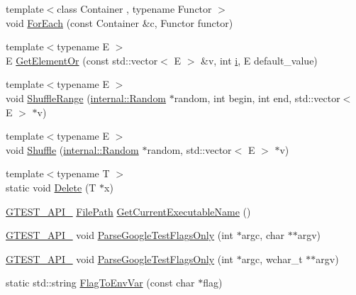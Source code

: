 \begin{DoxyCompactItemize}
\item 
{\footnotesize template$<$class Container , typename Functor $>$ }\\void \hyperlink{namespacetesting_1_1internal_a52f5504ed65d116201ccb8f99a44fd7e}{For\+Each} (const Container \&c, Functor functor)
\item 
{\footnotesize template$<$typename E $>$ }\\E \hyperlink{namespacetesting_1_1internal_a71fdd20a0686bea3dc0cdcd95e0bca1c}{Get\+Element\+Or} (const std\+::vector$<$ E $>$ \&v, int \hyperlink{gtest__output__test__golden__lin_8txt_a7e98b8a17c0aad30ba64d47b74e2a6c1}{i}, E default\+\_\+value)
\item 
{\footnotesize template$<$typename E $>$ }\\void \hyperlink{namespacetesting_1_1internal_a0e1d3dc36138a591769412d4c7779861}{Shuffle\+Range} (\hyperlink{classtesting_1_1internal_1_1Random}{internal\+::\+Random} $\ast$random, int begin, int end, std\+::vector$<$ E $>$ $\ast$v)
\item 
{\footnotesize template$<$typename E $>$ }\\void \hyperlink{namespacetesting_1_1internal_a90d9e6ffe8522a7eb1b2ce9b1a0c4673}{Shuffle} (\hyperlink{classtesting_1_1internal_1_1Random}{internal\+::\+Random} $\ast$random, std\+::vector$<$ E $>$ $\ast$v)
\item 
{\footnotesize template$<$typename T $>$ }\\static void \hyperlink{namespacetesting_1_1internal_a1e7045e09392aece10aea4517458b7ed}{Delete} (T $\ast$x)
\item 
\hyperlink{gtest-port_8h_aa73be6f0ba4a7456180a94904ce17790}{G\+T\+E\+S\+T\+\_\+\+A\+P\+I\+\_\+} \hyperlink{classtesting_1_1internal_1_1FilePath}{File\+Path} \hyperlink{namespacetesting_1_1internal_a7a2bbf069f75bc99873976ad6fc356ad}{Get\+Current\+Executable\+Name} ()
\item 
\hyperlink{gtest-port_8h_aa73be6f0ba4a7456180a94904ce17790}{G\+T\+E\+S\+T\+\_\+\+A\+P\+I\+\_\+} void \hyperlink{namespacetesting_1_1internal_a472880afbcc592a41e3d623e2dec8412}{Parse\+Google\+Test\+Flags\+Only} (int $\ast$argc, char $\ast$$\ast$argv)
\item 
\hyperlink{gtest-port_8h_aa73be6f0ba4a7456180a94904ce17790}{G\+T\+E\+S\+T\+\_\+\+A\+P\+I\+\_\+} void \hyperlink{namespacetesting_1_1internal_aa3c81a67914856448d0778990d9d9cab}{Parse\+Google\+Test\+Flags\+Only} (int $\ast$argc, wchar\+\_\+t $\ast$$\ast$argv)
\item 
static std\+::string \hyperlink{namespacetesting_1_1internal_a7540386ecf74d7ab7e2fa6089db94682}{Flag\+To\+Env\+Var} (const char $\ast$flag)

\end{DoxyCompactItemize}
